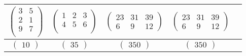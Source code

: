 \begin{table}[ht]
\begin{center}
\begin{tabular}{|c|c|c|c|c|}
			\hline
			$\begin{pmatrix}
				3 & 5\\
				2 & 1\\
				9 & 7\\
			\end{pmatrix}$
			&
			$\begin{pmatrix}
				1 & 2 & 3\\
				4 & 5 & 6 \\
			\end{pmatrix}$
			&
			$\begin{pmatrix}
				23 & 31 & 39 \\
				6 & 9 & 12
			\end{pmatrix}$ 
			&
			$\begin{pmatrix}
				23 & 31 & 39 \\
				6 & 9 & 12
			\end{pmatrix}$ \\ 
			\hline
			$\begin{pmatrix}
				10
			\end{pmatrix}$
			&
			$\begin{pmatrix}
				35
			\end{pmatrix}$
			&
			$\begin{pmatrix}
				350
			\end{pmatrix}$ 
			&
			$\begin{pmatrix}
				350
			\end{pmatrix}$ \\ 
			\hline
		\end{tabular}
	\end{center}
\end{table}

